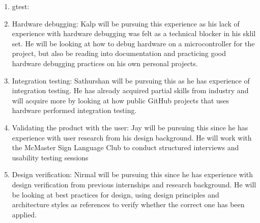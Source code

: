 \documentclass[12pt, titlepage]{article}
\begin{document}
\begin{enumerate}
  \begin{enumerate}
    \item gtest:
    \item Hardware debugging: Kalp will be pursuing this experience as his lack
    of experience with hardware debugging was felt as a technical blocker in 
    his sklil set. He will be looking at how to debug hardware 
    on a microcontroller for the project, but also be reading into documentation
    and practicing good hardware debugging practices on his own personal 
    projects. 
    \item Integration testing: Sathurshan will be pursuing this as he has
    experience of integration testing. He has already acquired partial skills
    from industry and will acquire more by looking at how public GitHub projects
    that uses hardware performed integration testing.
    \item Validating the product with the user: Jay will be pursuing this since he has experience 
    with user research from his design background. He will work with the McMaster Sign Language Club to 
    conduct structured interviews and usability testing sessions
    \item Design verification: Nirmal will be pursuing this since he has 
    experience with design verification from previous internships and research 
    background. He will be looking at best practices for design, using design 
    principles and architecture styles as references to verify whether the 
    correct one has been applied. 
  \end{enumerate}
\end{enumerate}
\end{document}
